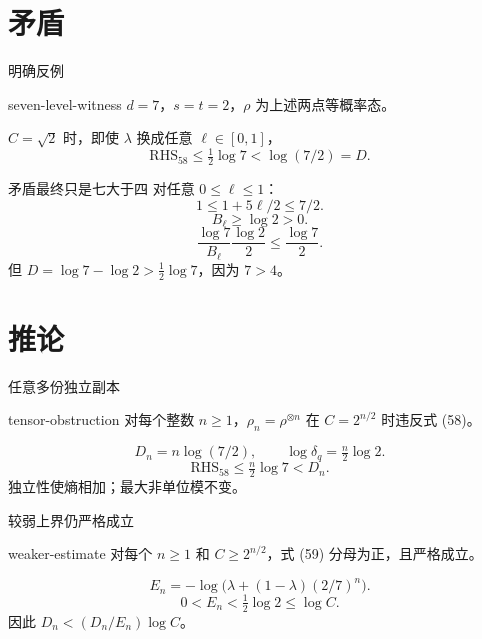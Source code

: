 \documentclass{beamer}
\begin{document}
\section{矛盾}
\begin{frame}{明确反例}
\begin{bookresult}{seven-level-witness}
$d=7$，$s=t=2$，$\rho$ 为上述两点等概率态。

$C=\sqrt2$ 时，即使 $\lambda$ 换成任意 $\ell\in[0,1]$，
\[\mathrm{RHS}_{58}\le\tfrac12\log7\mathrel{<}\log(7/2)=D.\]
\end{bookresult}
\end{frame}
\begin{frame}{矛盾最终只是七大于四}
对任意 $0\le\ell\le1$：
\[1\le1+5\ell/2\le7/2.\]
\[B_\ell\ge\log2>0.\]
\[\frac{\log7}{B_\ell}\frac{\log2}{2}\le\frac{\log7}{2}.\]
但 $D=\log7-\log2>\tfrac12\log7$，因为 $7>4$。
\end{frame}
\section{推论}
\begin{frame}{任意多份独立副本}
\begin{bookresult}{tensor-obstruction}
对每个整数 $n\ge1$，$\rho_n=\rho^{\otimes n}$ 在 $C=2^{n/2}$ 时违反式 (58)。
\end{bookresult}
\[D_n=n\log(7/2),\qquad\log\delta_q=\tfrac n2\log2.\]
\[\mathrm{RHS}_{58}\le\tfrac n2\log7\mathrel{<}D_n.\]
独立性使熵相加；最大非单位模不变。
\end{frame}
\begin{frame}{较弱上界仍严格成立}
\begin{bookresult}{weaker-estimate}
对每个 $n\ge1$ 和 $C\ge2^{n/2}$，式 (59) 分母为正，且严格成立。
\end{bookresult}
\[E_n=-\log\bigl(\lambda+(1-\lambda)(2/7)^n\bigr).\]
\[0\mathrel{<}E_n\mathrel{<}\tfrac12\log2\le\log C.\]
因此 $D_n\mathrel{<}(D_n/E_n)\log C$。
\end{frame}
\end{document}
